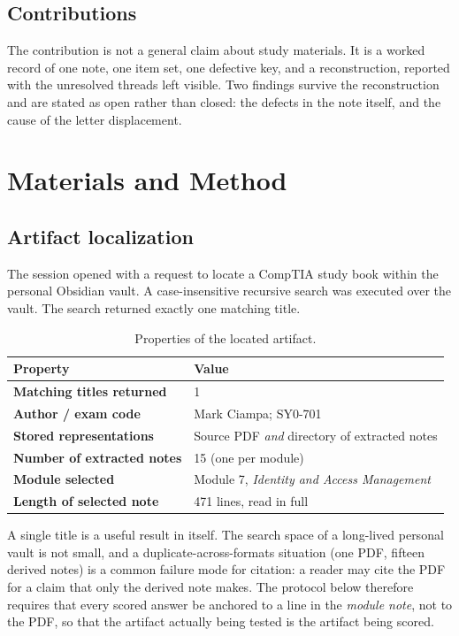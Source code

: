 \documentclass[11pt]{article}
\begin{document}
\subsection{Contributions}

The contribution is not a general claim about study materials. It is a
worked record of one note, one item set, one defective key, and a
reconstruction, reported with the unresolved threads left visible. Two
findings survive the reconstruction and are stated as open rather than
closed: the defects in the note itself, and the cause of the letter
displacement.

\section{Materials and Method}
\label{sec:method}

\subsection{Artifact localization}

The session opened with a request to locate a CompTIA study book within the
personal Obsidian vault. A case-insensitive recursive search was executed
over the vault. The search returned exactly one matching title.

\begin{table}[htbp]
\centering
\caption{Properties of the located artifact.}
\label{tab:artifact}
\begin{tabular}{@{}>{\bfseries}p{}p{}@{}}
\toprule
Property & Value \\
\midrule
Matching titles returned & 1 \\
Author / exam code        & Mark Ciampa; SY0-701 \\
Stored representations    & Source PDF \emph{and} directory of extracted notes \\
Number of extracted notes & 15 (one per module) \\
Module selected           & Module 7, \emph{Identity and Access Management} \\
Length of selected note   & 471 lines, read in full \\
\bottomrule
\end{tabular}
\end{table}

A single title is a useful result in itself. The search space of a
long-lived personal vault is not small, and a duplicate-across-formats
situation (one PDF, fifteen derived notes) is a common failure mode for
citation: a reader may cite the PDF for a claim that only the derived note
makes. The protocol below therefore requires that every scored answer be
anchored to a line in the \emph{module note}, not to the PDF, so that the
artifact actually being tested is the artifact being scored.
\end{document}

